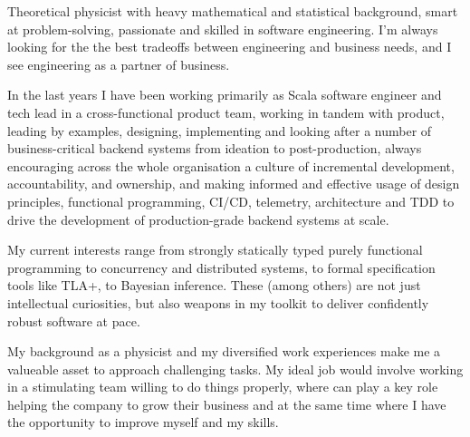 
\begin{cvparagraph}
Theoretical physicist with heavy mathematical and statistical 
background, smart at problem-solving, passionate and skilled in software engineering. 
I'm always looking for the the best tradeoffs between engineering and business needs, and I see engineering as a partner of business. 

  In the last years I have been working primarily as Scala software engineer and tech lead in a cross-functional product team, working in tandem with product, leading by examples, designing, implementing and looking after a number of business-critical backend systems from ideation to post-production, always encouraging across the whole organisation a culture of incremental development, accountability, and ownership, and making informed and effective usage of design principles, functional programming, CI/CD, telemetry, architecture and TDD to drive the development of production-grade backend systems at scale. 

  My current interests range from strongly statically typed purely functional programming to concurrency and distributed systems, to formal specification tools like TLA+, to Bayesian inference. These (among others) are not just intellectual curiosities, but also weapons in my toolkit to deliver confidently robust software at pace. 

My background as a physicist and my diversified work experiences make me a valueable asset to approach challenging tasks. 
My ideal job would involve working in a stimulating team willing to do things properly, where
can play a key role helping the company to grow their business and at the same time
where I have the opportunity to improve myself and my skills.
\end{cvparagraph}
